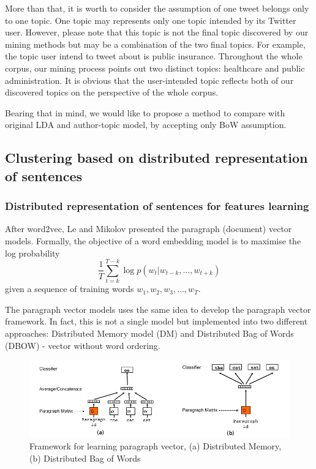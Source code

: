 \documentclass[11pt]{article}
\begin{document}
More than that, it is worth to consider the assumption of one tweet belongs only to one topic. One topic may represents only one topic intended by its Twitter user. However, please note that this topic is not the final topic discovered by our mining methods but may be a combination of the two final topics. For example, the topic user intend to tweet about is public insurance. Throughout the whole corpus, our mining process points out two distinct topics: healthcare and public administration. It is obvious that the user-intended topic reflects both of our discovered topics on the perspective of the whole corpus.

Bearing that in mind, we would like to propose a method to compare with original LDA and author-topic model, by accepting only BoW assumption.

\subsection{Clustering based on distributed representation of sentences} \label{doc2vec}

\subsubsection{Distributed representation of sentences for features learning}
After word2vec\cite{mikolov2013distributed}, Le and Mikolov presented the paragraph (document) vector models. Formally, the objective of a word embedding model  is to maximise the log probability
\[\frac{1}{T}\sum_{t=k}^{T-k}\log p(w_t|w_{t-k},\dots,w_{t+k}) \]
given a sequence of training words $w_1,w_2,w_3,\dots,w_T$.


The paragraph vector models uses the same idea to develop the paragraph vector framework. In fact, this is not a single model but implemented into two different approaches: Distributed Memory model (DM) and Distributed Bag of Words (DBOW) - vector without word ordering.

\begin{figure}[ht]
	\centering
	\includegraphics[width=\textwidth]{doc2vec}
	\caption{Framework for learning paragraph vector, (a) Distributed Memory, (b) Distributed Bag of Words}
	\label{fig:doc2vec}
\end{figure}
\end{document}
